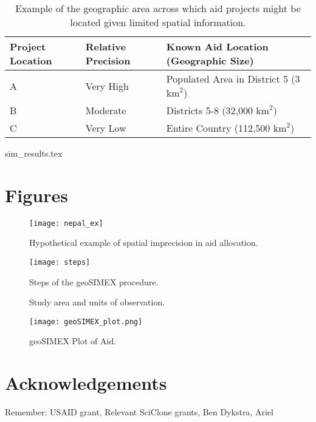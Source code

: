 \newpage
\begin{table}[!htbp]
	\begin{tabular}{| l | l | l |}
	\hline
	Project Location & Relative Precision & Known Aid Location (Geographic Size)\\
    \hline
    A &  Very High & Populated Area in District 5 (3 $\text{km}^2$) \\ \hline
    B &  Moderate & Districts 5-8 (32,000 $\text{km}^2$) \\ \hline
    C &  Very Low & Entire Country (112,500 $\text{km}^2$) \\ \hline
	\end{tabular}
	\caption{Example of the geographic area across which aid projects might be located given limited spatial information.}\label{precision_example}
\end{table}

\newpage
{sim_results.tex}

\newpage


\newpage

\section{Figures}

\begin{figure}[!htbp]
\texttt{[image: nepal\_ex]}
\caption{Hypothetical example of spatial imprecision in aid allocation.}\label{fig:nepalex}
\end{figure}

\begin{figure}[!htbp]
\texttt{[image: steps]}
\caption{Steps of the geoSIMEX procedure.}\label{fig:steps}
\end{figure}

\begin{figure}[!htbp]
\caption{Study area and units of observation.}\label{fig:studyarea}
\end{figure}

\begin{figure}[!htbp]
\texttt{[image: geoSIMEX\_plot.png]}
\caption{geoSIMEX Plot of Aid.}\label{fig:geoSIMEX_plot}
\end{figure}

\newpage

\section{Acknowledgements}
Remember: USAID grant, Relevant SciClone grants, Ben Dykstra, Ariel
\newpage

\printbibliography


